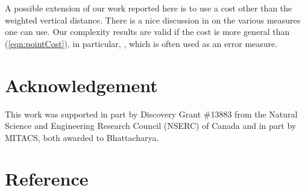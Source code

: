 \documentclass[preprint,10pt]{elsarticle}
\begin{document}
A possible extension of our work reported here is to use a cost other than the weighted vertical distance.
There is a nice discussion in \cite{guha2007} on the various measures one can use. 
Our complexity results are valid
if the cost is more general than (\ref{eqn:pointCost}),
in particular, ,
which is often used as an error measure.
\section*{Acknowledgement}\label{sec:ack}
This work was supported in part by Discovery Grant \#13883 from
the Natural Science and Engineering Research Council (NSERC) of Canada and in part by MITACS,
both awarded to Bhattacharya.


\section*{Reference}
\end{document}
